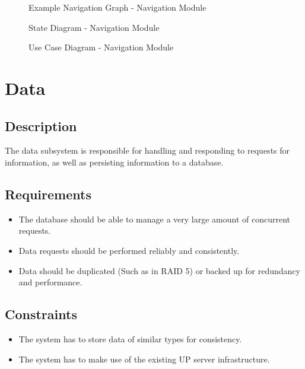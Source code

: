 \documentclass[english]{article}
\begin{document}
        \begin{figure}[H]
            \centering              
            \centerline{}
            \caption{Example Navigation Graph - Navigation Module}
        \end{figure}

        \begin{figure}[H]
            \centering              
            \centerline{}
            \caption{State Diagram - Navigation Module}
        \end{figure}

        \begin{figure}[H]
            \centering              
            \centerline{}
            \caption{Use Case Diagram - Navigation Module}
        \end{figure}

    \newpage
    \section{Data}
        \subsection{Description}
        The data subsystem is responsible for handling and responding to requests for information, as well as persisting information to a database.
        
        \subsection{Requirements}
        \begin{itemize}
            \item The database should be able to manage a very large amount of concurrent requests.
            \item Data requests should be performed reliably and consistently.
            \item Data should be duplicated (Such as in RAID 5) or backed up for redundancy and performance.
        \end{itemize}
        
        \subsection{Constraints}
        \begin{itemize}
            \item The system has to store data of similar types for consistency.
            \item The system has to make use of the existing UP server infrastructure.
        \end{itemize}
        
\end{document}
